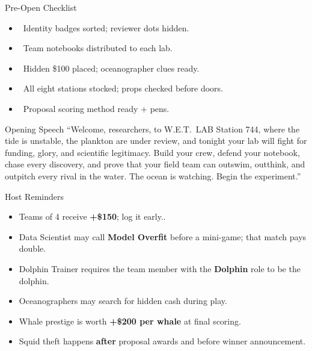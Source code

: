 \documentclass[12pt]{extarticle}
\newcommand{\checkbox}{\fbox{\rule{0pt}{0.72em}\rule{0.72em}{0pt}}}
\begin{document}
\begin{minipage}[t]{0.485\textwidth}
\vspace{0pt}
\begin{labbox}{Pre-Open Checklist}
\begin{itemize}
\item \checkbox\ Identity badges sorted; reviewer dots hidden.
\item \checkbox\ Team notebooks distributed to each lab.
\item \checkbox\ Hidden \$100 placed; oceanographer clues ready.
\item \checkbox\ All eight stations stocked; props checked before doors.
\item \checkbox\ Proposal scoring method ready + pens.
\end{itemize}
\end{labbox}

\begin{labbox}{Opening Speech}
\small
``Welcome, researchers, to W.E.T.~LAB Station 744, where the tide is unstable, the plankton are under review, and tonight your lab will fight for funding, glory, and scientific legitimacy. Build your crew, defend your notebook, chase every discovery, and prove that your field team can outswim, outthink, and outpitch every rival in the water. The ocean is watching. Begin the experiment.''
\end{labbox}

\begin{labbox}{Host Reminders}
\begin{itemize}
\item Teams of 4 receive \textbf{+\$150}; log it early..
\item Data Scientist may call \textbf{Model Overfit} before a mini-game; that match pays double.
\item Dolphin Trainer requires the team member with the \textbf{Dolphin} role to be the dolphin.
\item Oceanographers may search for hidden cash during play.
\item Whale prestige is worth \textbf{+\$200 per whale} at final scoring.
\item Squid theft happens \textbf{after} proposal awards and before winner announcement.
\end{itemize}
\end{labbox}


\end{minipage}
\end{document}
